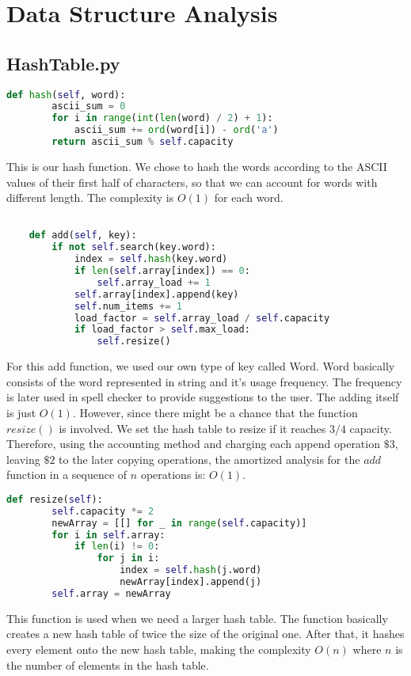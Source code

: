 \documentclass[10pt]{article}
\theoremstyle{definition}
\begin{document}
\section{Data Structure Analysis}


\subsection{HashTable.py}

\begin{lstlisting}[language=Python, basicstyle=\small]
    def hash(self, word):
        ascii_sum = 0
        for i in range(int(len(word) / 2) + 1):
            ascii_sum += ord(word[i]) - ord('a')
        return ascii_sum % self.capacity
\end{lstlisting}

This is our hash function. We chose to hash the words according to the ASCII values of their first half of characters, so that we can account for words with different length. The complexity is $O(1)$ for each word.

\begin{lstlisting}[language=Python, basicstyle=\small]

    def add(self, key):
        if not self.search(key.word):
            index = self.hash(key.word)
            if len(self.array[index]) == 0:
                self.array_load += 1
            self.array[index].append(key)
            self.num_items += 1
            load_factor = self.array_load / self.capacity
            if load_factor > self.max_load:
                self.resize()
\end{lstlisting}

For this add function, we used our own type of key called Word. Word basically consists of the word represented in string and it's usage frequency. The frequency is later used in spell checker to provide suggestions to the user. The adding itself is just $O(1)$. However, since there might be a chance that the function $resize()$ is involved. We set the hash table to resize if it reaches $3/4$ capacity. Therefore, using the accounting method and charging each append operation $\$3$, leaving $\$2$ to the later copying operations, the amortized analysis for the $add$ function in a sequence of $n$ operations is: $O(1)$.

\begin{lstlisting}[language=Python, basicstyle=\small]
    def resize(self):
        self.capacity *= 2
        newArray = [[] for _ in range(self.capacity)]
        for i in self.array:
            if len(i) != 0:
                for j in i:
                    index = self.hash(j.word)
                    newArray[index].append(j)
        self.array = newArray
\end{lstlisting}
This function is used when we need a larger hash table. The function basically creates a new hash table of twice the size of the original one. After that, it hashes every element onto the new hash table, making the complexity $O(n)$ where $n$ is the number of elements in the hash table.
\end{document}
